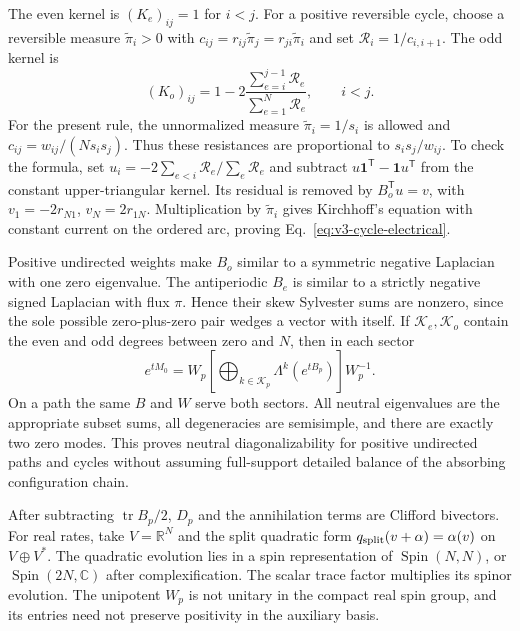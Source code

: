 \documentclass[aps,pre,reprint,amsmath,amssymb,longbibliography]{revtex4-2}
\begin{document}
The even kernel is $(K_e)_{ij}=1$ for $i<j$. For a positive reversible
cycle, choose a reversible measure $\widetilde\pi_i>0$ with
$c_{ij}=r_{ij}\widetilde\pi_j=r_{ji}\widetilde\pi_i$ and set
$\mathcal R_i=1/c_{i,i+1}$. The odd kernel is
\begin{equation}
 (K_o)_{ij}=1-2\frac{\sum_{e=i}^{j-1}\mathcal R_e}
                         {\sum_{e=1}^N\mathcal R_e},\qquad i<j.
 \label{eq:v3-cycle-electrical}
\end{equation}
For the present rule, the unnormalized measure $\widetilde\pi_i=1/s_i$
is allowed and
$c_{ij}=w_{ij}/(Ns_is_j)$. Thus these resistances are proportional to
$s_is_j/w_{ij}$. To check the formula, set
$u_i=-2\sum_{e<i}\mathcal R_e/\sum_e\mathcal R_e$ and subtract
$u\boldsymbol1^{\mathsf T}-\boldsymbol1u^{\mathsf T}$ from the constant
upper-triangular kernel. Its residual is removed by
$B_o^{\mathsf T}u=v$, with $v_1=-2r_{N1}$, $v_N=2r_{1N}$.
Multiplication by $\widetilde\pi_i$ gives Kirchhoff's equation with constant
current on the ordered arc, proving Eq.~\eqref{eq:v3-cycle-electrical}.

Positive undirected weights make $B_o$ similar to a symmetric negative
Laplacian with one zero eigenvalue. The antiperiodic $B_e$ is similar
to a strictly negative signed Laplacian with flux $\pi$. Hence their
skew Sylvester sums are nonzero, since the sole possible zero-plus-zero
pair wedges a vector with itself. If $\mathcal K_e,\mathcal K_o$ contain the
even and odd degrees between zero and $N$, then in each sector
\begin{equation}
 e^{tM_0}=W_p\left[\bigoplus_{k\in\mathcal K_p}
                \Lambda^k(e^{tB_p})\right]W_p^{-1}.
 \label{eq:v3-neutral-exterior}
\end{equation}
On a path the same $B$ and $W$ serve both sectors. All neutral eigenvalues
are the appropriate subset sums, all degeneracies are semisimple, and
there are exactly two zero modes. This proves neutral diagonalizability
for positive undirected paths and cycles without assuming full-support
detailed balance of the absorbing configuration chain.

After subtracting $\operatorname{tr}B_p/2$, $D_p$ and the annihilation
terms are Clifford bivectors. For real rates, take $V=\mathbb R^N$
and the split quadratic form $q_{\rm split}(v+\alpha)=\alpha(v)$ on $V\oplus V^*$.
The quadratic evolution lies in a spin representation of
$\operatorname{Spin}(N,N)$, or $\operatorname{Spin}(2N,\mathbb C)$
after complexification. The scalar
trace factor multiplies its spinor evolution. The unipotent $W_p$ is
not unitary in the compact real spin group, and its entries need not
preserve positivity in the auxiliary basis.
\end{document}
